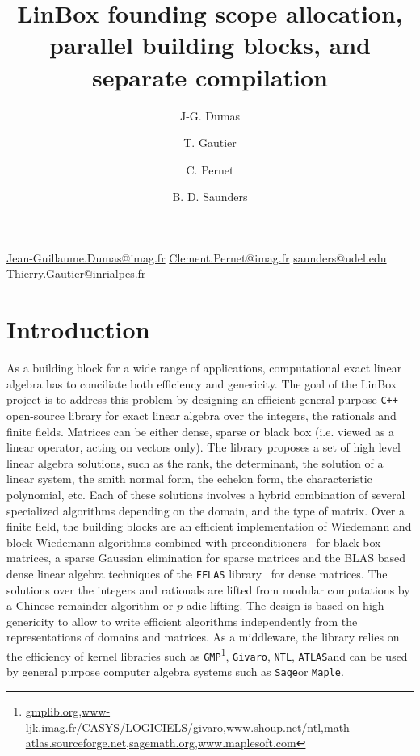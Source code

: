 \documentclass[runningheads,a4paper]{llncs}
\newcommand{\linbox}{{\sc LinBox}\xspace}
\begin{document}
\mainmatter  
\title{\linbox founding scope allocation, parallel building blocks, and
  separate compilation}
\titlerunning{\linbox memory, parallelism, compilation models}

\urldef\jgdemail\url{Jean-Guillaume.Dumas@imag.fr}
\urldef\cpemail\url{Clement.Pernet@imag.fr}
\urldef\bdsemail\url{saunders@udel.edu}
\urldef\tgemail\url{Thierry.Gautier@inrialpes.fr}

\author{
J-G. Dumas
\and T. Gautier
\and C. Pernet
\and B. D. Saunders
}
\maketitle
\section{Introduction}
As a building block for a wide range of applications, computational exact linear
algebra has to conciliate both efficiency and genericity. The goal of the 
\linbox project is to address this problem by designing an efficient general-purpose
\texttt{C++} open-source library for exact linear algebra over the integers, the
rationals and finite fields. 
Matrices can be either dense, sparse or black box (i.e. viewed as a linear
operator, acting on vectors only). The library proposes a set of high level
linear algebra solutions, such as the rank, the determinant, the solution of a
linear system, the smith normal form, the echelon form, the characteristic
polynomial, etc. Each of these solutions involves a hybrid combination of several specialized
algorithms depending on the domain, and the type of matrix. Over a finite field,
the building blocks are an efficient implementation of Wiedemann and block
Wiedemann algorithms combined with preconditioners~\cite{CEKSTV:2002:EP} for
black box matrices, a sparse Gaussian elimination for sparse matrices and the
BLAS based dense linear algebra techniques of the \texttt{FFLAS}
library~\cite{DGP:2008:dlaff} for dense matrices. The solutions over the integers
and rationals are lifted from modular computations by a Chinese remainder
algorithm or $p$-adic lifting.
The design is based on high genericity to allow to write efficient algorithms independently from the
representations of domains and matrices. As a middleware, the library relies on the
efficiency of kernel libraries such as  \texttt{GMP}\footnote{\url{gmplib.org,www-ljk.imag.fr/CASYS/LOGICIELS/givaro,www.shoup.net/ntl,math-atlas.sourceforge.net,sagemath.org,www.maplesoft.com}},
\texttt{Givaro}\footnotemark[4],
\texttt{NTL}\footnotemark[4],
\texttt{ATLAS}\footnotemark[4] and can be used by general
purpose computer algebra systems such as \texttt{Sage}\footnotemark[4] or \texttt{Maple}\footnotemark[4].
\end{document}
